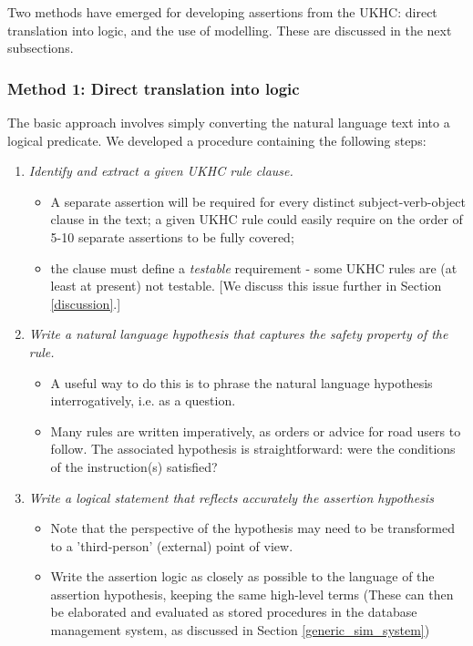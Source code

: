 Two methods have emerged for developing assertions from the UKHC: direct translation into logic, and the use of modelling. These are discussed in the next subsections.

\subsubsection{Method 1: Direct translation into logic} \label{direct_translation}

The basic approach involves simply converting the natural language text into a logical predicate. We developed a procedure containing the following steps: 
\begin{enumerate}
    \item \emph{Identify and extract a given UKHC rule clause.} 
    \begin{itemize}
    	\item A separate assertion will be required for every distinct subject-verb-object clause in the text; a given UKHC rule could easily require on the order of 5-10 separate assertions to be fully covered;
    	\item the clause must define a \emph{testable} requirement - some UKHC rules are (at least at present) not testable. [We discuss this issue further in Section \ref{discussion}.]
    \end{itemize} 
    \item \emph{Write a natural language hypothesis that captures the safety property of the rule.} 
    \begin{itemize}
    	\item A useful way to do this is to phrase the natural language hypothesis interrogatively, i.e. as a question.
    	\item Many rules are written imperatively, as orders or advice for road users to follow. The associated hypothesis is straightforward: were the conditions of the instruction(s) satisfied?
    \end{itemize}
      
    \item \emph{Write a logical statement that reflects accurately the assertion hypothesis}
    \begin{itemize}
    	\item Note that the perspective of the hypothesis may need to be transformed to a 'third-person' (external) point of view.
    	\item Write the assertion logic as closely as possible to the language of the assertion hypothesis, keeping the same high-level terms (These can then be elaborated and evaluated as stored procedures in the database management system, as discussed in Section \ref{generic_sim_system}) 
    \end{itemize}
   

\end{enumerate}
